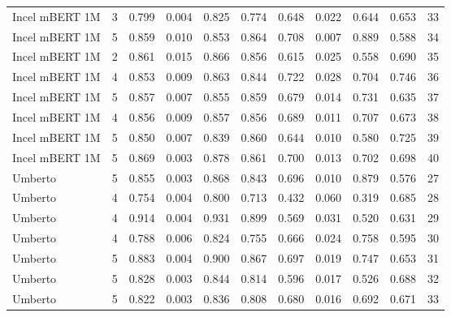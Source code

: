 \begin{tabular}{lrrrrrrrrrr}
    Incel mBERT 1M &      3 &   0.799 &          0.004 &    0.825 &     0.774 &    0.648 &           0.022 &     0.644 &      0.653 &  33 \\
    Incel mBERT 1M &      5 &   0.859 &          0.010 &    0.853 &     0.864 &    0.708 &           0.007 &     0.889 &      0.588 &  34 \\
    Incel mBERT 1M &      2 &   0.861 &          0.015 &    0.866 &     0.856 &    0.615 &           0.025 &     0.558 &      0.690 &  35 \\
    Incel mBERT 1M &      4 &   0.853 &          0.009 &    0.863 &     0.844 &    0.722 &           0.028 &     0.704 &      0.746 &  36 \\
    Incel mBERT 1M &      5 &   0.857 &          0.007 &    0.855 &     0.859 &    0.679 &           0.014 &     0.731 &      0.635 &  37 \\
    Incel mBERT 1M &      4 &   0.856 &          0.009 &    0.857 &     0.856 &    0.689 &           0.011 &     0.707 &      0.673 &  38 \\
    Incel mBERT 1M &      5 &   0.850 &          0.007 &    0.839 &     0.860 &    0.644 &           0.010 &     0.580 &      0.725 &  39 \\
    Incel mBERT 1M &      5 &   0.869 &          0.003 &    0.878 &     0.861 &    0.700 &           0.013 &     0.702 &      0.698 &  40 \\
           Umberto &      5 &   0.855 &          0.003 &    0.868 &     0.843 &    0.696 &           0.010 &     0.879 &      0.576 &  27 \\
           Umberto &      4 &   0.754 &          0.004 &    0.800 &     0.713 &    0.432 &           0.060 &     0.319 &      0.685 &  28 \\
           Umberto &      4 &   0.914 &          0.004 &    0.931 &     0.899 &    0.569 &           0.031 &     0.520 &      0.631 &  29 \\
           Umberto &      4 &   0.788 &          0.006 &    0.824 &     0.755 &    0.666 &           0.024 &     0.758 &      0.595 &  30 \\
           Umberto &      5 &   0.883 &          0.004 &    0.900 &     0.867 &    0.697 &           0.019 &     0.747 &      0.653 &  31 \\
           Umberto &      5 &   0.828 &          0.003 &    0.844 &     0.814 &    0.596 &           0.017 &     0.526 &      0.688 &  32 \\
           Umberto &      5 &   0.822 &          0.003 &    0.836 &     0.808 &    0.680 &           0.016 &     0.692 &      0.671 &  33 \\

\end{tabular}
